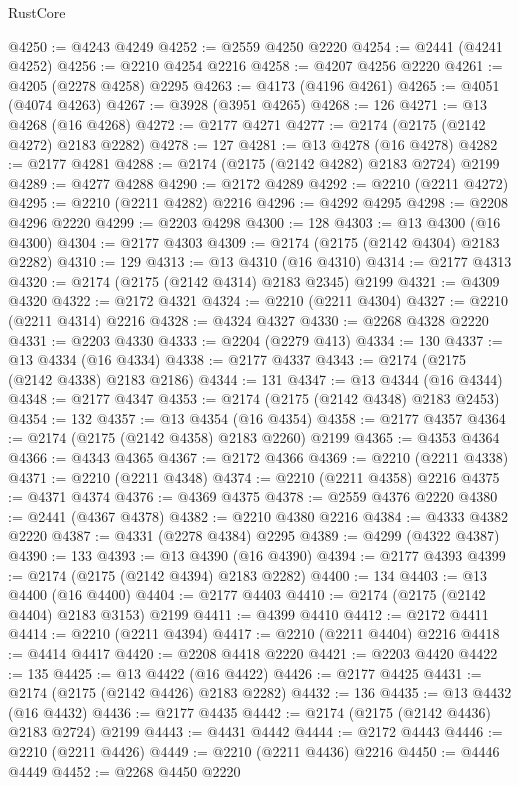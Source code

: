 \begin{lexlean}{RustCore}
\begin{coremodule}
@4250 := @4243 @4249
@4252 := @2559 @4250 @2220
@4254 := @2441 (@4241 @4252)
@4256 := @2210 @4254 @2216
@4258 := @4207 @4256 @2220
@4261 := @4205 (@2278 @4258) @2295
@4263 := @4173 (@4196 @4261)
@4265 := @4051 (@4074 @4263)
@4267 := @3928 (@3951 @4265)
@4268 := 126
@4271 := @13 @4268 (@16 @4268)
@4272 := @2177 @4271
@4277 := @2174 (@2175 (@2142 @4272) @2183 @2282)
@4278 := 127
@4281 := @13 @4278 (@16 @4278)
@4282 := @2177 @4281
@4288 := @2174 (@2175 (@2142 @4282) @2183 @2724) @2199
@4289 := @4277 @4288
@4290 := @2172 @4289
@4292 := @2210 (@2211 @4272)
@4295 := @2210 (@2211 @4282) @2216
@4296 := @4292 @4295
@4298 := @2208 @4296 @2220
@4299 := @2203 @4298
@4300 := 128
@4303 := @13 @4300 (@16 @4300)
@4304 := @2177 @4303
@4309 := @2174 (@2175 (@2142 @4304) @2183 @2282)
@4310 := 129
@4313 := @13 @4310 (@16 @4310)
@4314 := @2177 @4313
@4320 := @2174 (@2175 (@2142 @4314) @2183 @2345) @2199
@4321 := @4309 @4320
@4322 := @2172 @4321
@4324 := @2210 (@2211 @4304)
@4327 := @2210 (@2211 @4314) @2216
@4328 := @4324 @4327
@4330 := @2268 @4328 @2220
@4331 := @2203 @4330
@4333 := @2204 (@2279 @413)
@4334 := 130
@4337 := @13 @4334 (@16 @4334)
@4338 := @2177 @4337
@4343 := @2174 (@2175 (@2142 @4338) @2183 @2186)
@4344 := 131
@4347 := @13 @4344 (@16 @4344)
@4348 := @2177 @4347
@4353 := @2174 (@2175 (@2142 @4348) @2183 @2453)
@4354 := 132
@4357 := @13 @4354 (@16 @4354)
@4358 := @2177 @4357
@4364 := @2174 (@2175 (@2142 @4358) @2183 @2260) @2199
@4365 := @4353 @4364
@4366 := @4343 @4365
@4367 := @2172 @4366
@4369 := @2210 (@2211 @4338)
@4371 := @2210 (@2211 @4348)
@4374 := @2210 (@2211 @4358) @2216
@4375 := @4371 @4374
@4376 := @4369 @4375
@4378 := @2559 @4376 @2220
@4380 := @2441 (@4367 @4378)
@4382 := @2210 @4380 @2216
@4384 := @4333 @4382 @2220
@4387 := @4331 (@2278 @4384) @2295
@4389 := @4299 (@4322 @4387)
@4390 := 133
@4393 := @13 @4390 (@16 @4390)
@4394 := @2177 @4393
@4399 := @2174 (@2175 (@2142 @4394) @2183 @2282)
@4400 := 134
@4403 := @13 @4400 (@16 @4400)
@4404 := @2177 @4403
@4410 := @2174 (@2175 (@2142 @4404) @2183 @3153) @2199
@4411 := @4399 @4410
@4412 := @2172 @4411
@4414 := @2210 (@2211 @4394)
@4417 := @2210 (@2211 @4404) @2216
@4418 := @4414 @4417
@4420 := @2208 @4418 @2220
@4421 := @2203 @4420
@4422 := 135
@4425 := @13 @4422 (@16 @4422)
@4426 := @2177 @4425
@4431 := @2174 (@2175 (@2142 @4426) @2183 @2282)
@4432 := 136
@4435 := @13 @4432 (@16 @4432)
@4436 := @2177 @4435
@4442 := @2174 (@2175 (@2142 @4436) @2183 @2724) @2199
@4443 := @4431 @4442
@4444 := @2172 @4443
@4446 := @2210 (@2211 @4426)
@4449 := @2210 (@2211 @4436) @2216
@4450 := @4446 @4449
@4452 := @2268 @4450 @2220

\end{coremodule}
\end{lexlean}
